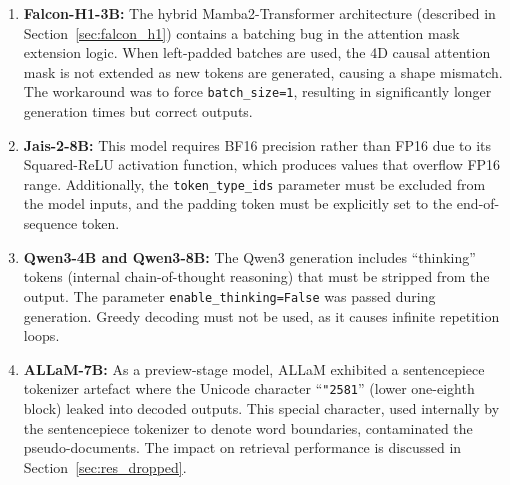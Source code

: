 \begin{enumerate}
    \item \textbf{Falcon-H1-3B:} The hybrid Mamba2-Transformer architecture (described in Section~\ref{sec:falcon_h1}) contains a batching bug in the attention mask extension logic. When left-padded batches are used, the 4D causal attention mask is not extended as new tokens are generated, causing a shape mismatch. The workaround was to force \texttt{batch\_size=1}, resulting in significantly longer generation times but correct outputs.

    \item \textbf{Jais-2-8B:} This model requires BF16 precision rather than FP16 due to its Squared-ReLU activation function, which produces values that overflow FP16 range. Additionally, the \texttt{token\_type\_ids} parameter must be excluded from the model inputs, and the padding token must be explicitly set to the end-of-sequence token.

    \item \textbf{Qwen3-4B and Qwen3-8B:} The Qwen3 generation includes ``thinking'' tokens (internal chain-of-thought reasoning) that must be stripped from the output. The parameter \texttt{enable\_thinking=False} was passed during generation. Greedy decoding must not be used, as it causes infinite repetition loops.

    \item \textbf{ALLaM-7B:} As a preview-stage model, ALLaM exhibited a sentencepiece tokenizer artefact where the Unicode character ``\texttt{\char"2581}'' (lower one-eighth block) leaked into decoded outputs. This special character, used internally by the sentencepiece tokenizer to denote word boundaries, contaminated the pseudo-documents. The impact on retrieval performance is discussed in Section~\ref{sec:res_dropped}.
\end{enumerate}

